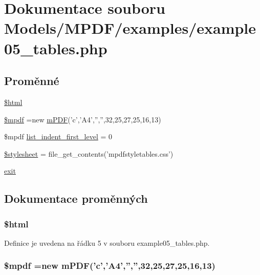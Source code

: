 \hypertarget{example05__tables_8php}{\section{Dokumentace souboru Models/\-M\-P\-D\-F/examples/example05\-\_\-tables.php}
\label{example05__tables_8php}
}
\subsection*{Proměnné}
\begin{DoxyCompactItemize}
\item 
\hyperlink{example05__tables_8php_a6f96e7fc92441776c9d1cd3386663b40}{\$html}
\item 
\hyperlink{example05__tables_8php_ad028f81910d6cbab9b184d2214b3a8f8}{\$mpdf} =new \hyperlink{classm_p_d_f}{m\-P\-D\-F}('c','A4','','',32,25,27,25,16,13)
\item 
\$mpdf \hyperlink{example05__tables_8php_a8780612514d14375709d0685d189579e}{list\-\_\-indent\-\_\-first\-\_\-level} = 0
\item 
\hyperlink{example05__tables_8php_a19e5cf73e817c55a49205e6ec78c88a8}{\$stylesheet} = file\-\_\-get\-\_\-contents('mpdfstyletables.\-css')
\item 
\hyperlink{example05__tables_8php_a6733eb5f605d09eaede9845835d71c4e}{exit}
\end{DoxyCompactItemize}


\subsection{Dokumentace proměnných}
\hypertarget{example05__tables_8php_a6f96e7fc92441776c9d1cd3386663b40}{
\subsubsection[{\$html}]{\setlength{\rightskip}{0pt plus 5cm}\$html}}\label{example05__tables_8php_a6f96e7fc92441776c9d1cd3386663b40}


Definice je uvedena na řádku 5 v souboru example05\-\_\-tables.\-php.

\hypertarget{example05__tables_8php_ad028f81910d6cbab9b184d2214b3a8f8}{
\subsubsection[{\$mpdf}]{\setlength{\rightskip}{0pt plus 5cm}\$mpdf =new {\bf m\-P\-D\-F}('c','A4','','',32,25,27,25,16,13)}}\label{example05__tables_8php_ad028f81910d6cbab9b184d2214b3a8f8}


